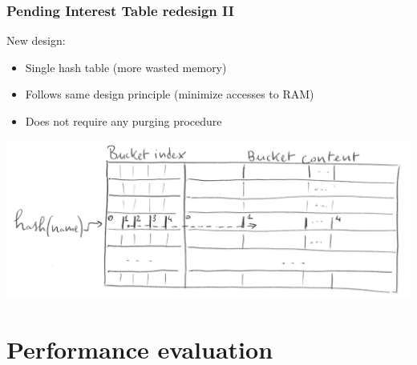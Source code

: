 \begin{frame}[fragile]
  \frametitle{Pending Interest Table redesign II}
  New design:
  \vspace{-6pt}
  \begin{itemize}
    \item Single hash table (more wasted memory)
    \item Follows same design principle (minimize accesses to RAM)
    \item Does not require any purging procedure
  \end{itemize}
  \vspace{-14pt}
  \begin{center}
    \includegraphics[width=\linewidth]{img/new_pit_sketch_trans.png}
  \end{center}
\end{frame}

\section{Performance evaluation}

